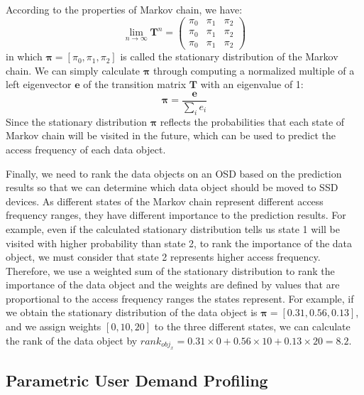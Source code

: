 According to the properties of Markov chain, we have:
\begin{equation}
\lim_{n\to\infty}\mathbf{T}^{n} =
 \begin{pmatrix}
  \pi_{0} & \pi_{1} & \pi_{2} \\
  \pi_{0} & \pi_{1} & \pi_{2} \\
  \pi_{0} & \pi_{1} & \pi_{2}
 \end{pmatrix}
\end{equation}
in which $\boldsymbol{\pi} = [\pi_{0}, \pi_{1},  \pi_{2}]$ is called the stationary distribution of the Markov chain. We can simply calculate $\boldsymbol{\pi} $ through computing a normalized multiple of a left eigenvector $\mathbf{e}$ of the transition matrix $\mathbf{T}$ with an eigenvalue of 1:
\begin{equation}
\boldsymbol{\pi} = \frac{\mathbf{e}}{\sum_{i}e_{i}}
\end{equation}
Since the stationary distribution $\boldsymbol{\pi}$ reflects the probabilities that each state of Markov chain will be visited in the future, which can be used to predict the access frequency of each data object.

Finally, we need to rank the data objects on an OSD based on the prediction results so that we can determine which data object should be moved to SSD devices. As different states of the Markov chain represent different access frequency ranges, they have different importance to the prediction results. For example, even if the calculated stationary distribution tells us state 1 will be visited with higher probability than state 2, to rank the importance of the data object, we must consider that state 2 represents higher access frequency. Therefore, we use a weighted sum of the stationary distribution to rank the importance of the data object and the weights are defined by values that are proportional to the access frequency ranges the states represent. For example, if we obtain the stationary distribution of the data object is $\boldsymbol{\pi} = [0.31, 0.56, 0.13]$, and we assign weights $[0, 10, 20]$ to the three different states, we can calculate the rank of the data object by $rank_{obj_{x}} = 0.31\times0+0.56\times10+0.13\times20 = 8.2$.

\subsection{Parametric User Demand Profiling}


